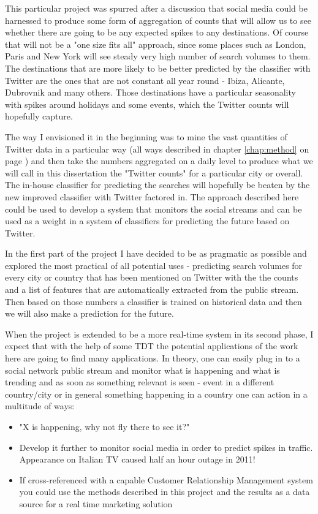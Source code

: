 \documentclass[minf,frontabs,twoside,singlespacing,parskip]{infthesis}
\begin{document}
This particular project was spurred after a discussion that social media could be harnessed to produce some form of aggregation of counts that will allow us to see whether there are going to be any expected spikes to any destinations. Of course that will not be a "one size fits all" approach, since some places such as London, Paris and New York will see steady very high number of search volumes to them. The destinations that are more likely to be better predicted by the classifier with Twitter are the ones that are not constant all year round - Ibiza, Alicante, Dubrovnik and many others. Those destinations have a particular seasonality with spikes around holidays and some events, which the Twitter counts will hopefully capture.


The way I envisioned it in the beginning was to mine the vast quantities of Twitter data in a particular way (all ways described in chapter \ref{chap:method} on page \pageref{chap:method}) and then take the numbers aggregated on a daily level to produce what we will call in this dissertation the "Twitter counts" for a particular city or overall. The in-house classifier for predicting the searches will hopefully be beaten by the new improved classifier with Twitter factored in. The approach described here could be used to develop a system that monitors the social streams and can be used as a weight in a system of classifiers for predicting the future based on Twitter.


In the first part of the project I have decided to be as pragmatic as possible and explored the most practical of all potential uses - predicting search volumes for every city or country that has been mentioned on Twitter with the the counts and a list of features that are automatically extracted from the public stream. Then based on those numbers a classifier is trained on historical data and then we will also make a prediction for the future. 


When the project is extended to be a more real-time system in its second phase, I expect that with the help of some TDT the potential applications of the work here are going to find many applications. In theory, one can easily plug in to a social network public stream and monitor what is happening and what is trending and as soon as something relevant is seen - event in a different country/city or in general something happening in a country one can action in a multitude of ways:

\begin{itemize}
\item "X is happening, why not fly there to see it?"
\item Develop it further to monitor social media in order to predict spikes in traffic. Appearance on Italian TV caused half an hour outage in 2011!
\item If cross-referenced with a capable Customer Relationship Management system you could use the methods described in this project and the results as a data source for a real time marketing solution
\end{itemize}
\end{document}
